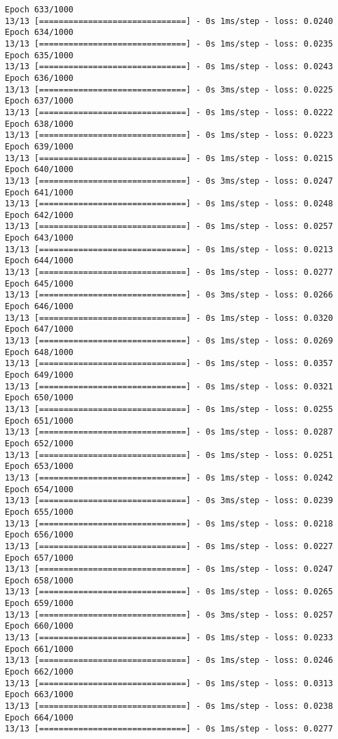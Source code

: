 \documentclass[11pt]{article}
\begin{document}
\begin{Verbatim}[commandchars=\\\{\}]
Epoch 633/1000
13/13 [==============================] - 0s 1ms/step - loss: 0.0240
Epoch 634/1000
13/13 [==============================] - 0s 1ms/step - loss: 0.0235
Epoch 635/1000
13/13 [==============================] - 0s 1ms/step - loss: 0.0243
Epoch 636/1000
13/13 [==============================] - 0s 3ms/step - loss: 0.0225
Epoch 637/1000
13/13 [==============================] - 0s 1ms/step - loss: 0.0222
Epoch 638/1000
13/13 [==============================] - 0s 1ms/step - loss: 0.0223
Epoch 639/1000
13/13 [==============================] - 0s 1ms/step - loss: 0.0215
Epoch 640/1000
13/13 [==============================] - 0s 3ms/step - loss: 0.0247
Epoch 641/1000
13/13 [==============================] - 0s 1ms/step - loss: 0.0248
Epoch 642/1000
13/13 [==============================] - 0s 1ms/step - loss: 0.0257
Epoch 643/1000
13/13 [==============================] - 0s 1ms/step - loss: 0.0213
Epoch 644/1000
13/13 [==============================] - 0s 1ms/step - loss: 0.0277
Epoch 645/1000
13/13 [==============================] - 0s 3ms/step - loss: 0.0266
Epoch 646/1000
13/13 [==============================] - 0s 1ms/step - loss: 0.0320
Epoch 647/1000
13/13 [==============================] - 0s 1ms/step - loss: 0.0269
Epoch 648/1000
13/13 [==============================] - 0s 1ms/step - loss: 0.0357
Epoch 649/1000
13/13 [==============================] - 0s 1ms/step - loss: 0.0321
Epoch 650/1000
13/13 [==============================] - 0s 1ms/step - loss: 0.0255
Epoch 651/1000
13/13 [==============================] - 0s 1ms/step - loss: 0.0287
Epoch 652/1000
13/13 [==============================] - 0s 1ms/step - loss: 0.0251
Epoch 653/1000
13/13 [==============================] - 0s 1ms/step - loss: 0.0242
Epoch 654/1000
13/13 [==============================] - 0s 3ms/step - loss: 0.0239
Epoch 655/1000
13/13 [==============================] - 0s 1ms/step - loss: 0.0218
Epoch 656/1000
13/13 [==============================] - 0s 1ms/step - loss: 0.0227
Epoch 657/1000
13/13 [==============================] - 0s 1ms/step - loss: 0.0247
Epoch 658/1000
13/13 [==============================] - 0s 1ms/step - loss: 0.0265
Epoch 659/1000
13/13 [==============================] - 0s 3ms/step - loss: 0.0257
Epoch 660/1000
13/13 [==============================] - 0s 1ms/step - loss: 0.0233
Epoch 661/1000
13/13 [==============================] - 0s 1ms/step - loss: 0.0246
Epoch 662/1000
13/13 [==============================] - 0s 1ms/step - loss: 0.0313
Epoch 663/1000
13/13 [==============================] - 0s 1ms/step - loss: 0.0238
Epoch 664/1000
13/13 [==============================] - 0s 1ms/step - loss: 0.0277

\end{Verbatim}
\end{document}
